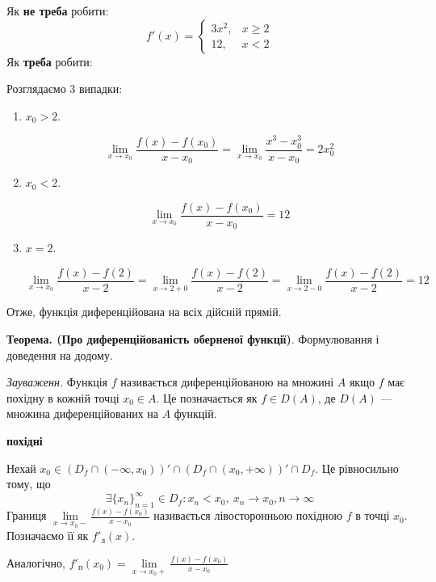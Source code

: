 \documentclass[12pt]{report}
\begin{document}
\begin{enumerate}
Як \textbf{не треба} робити:
$$f'(x) = \begin{cases} 3 x^2,& x \geq 2 \\ 12, & x < 2\end{cases}$$
Як \textbf{треба} робити:

\vspace{1mm}

Розглядаємо $3$ випадки:

\begin{enumerate}
\item $x_0 > 2$.

$$\lim_{x \to x_0}\frac{f(x) - f(x_0)}{x - x_0} = \lim_{x \to x_0}\frac{x^3 - x_0^3}{x - x_0} = 2 x_0^2$$

\item $x_0 < 2$.

$$\lim_{x \to x_0}\frac{f(x) - f(x_0)}{x - x_0} = 12$$

\item $x = 2$.

$$\lim_{x \to x_0}\frac{f(x) - f(2)}{x - 2} = \lim_{x \to 2+0}\frac{f(x) - f(2)}{x - 2} = \lim_{x \to 2-0}\frac{f(x) - f(2)}{x - 2} = 12$$
\end{enumerate}

Отже, функція диференційована на всіх дійсній прямій.
 
\end{enumerate}

\textbf{Теорема. (Про диференційованість оберненої функції)}. Формулювання і доведення на додому.

\textit{Зауваженн.} Функція $f$ називається диференційованою на множині $A$ якщо $f$ має 
похідну в кожній точці $x_0 \in A$. Це позначається як $f \in D(A)$, де $D(A)$ --- множина диференційованих на $A$ функцій. 

\begin{center}
\textbf{ похідні}
\end{center}

Нехай $x_0 \in (D_f \cap (-\infty, x_0))' \cap (D_f \cap (x_0, +\infty))'\cap D_f$. Це рівносильно тому, що 
$$\exists \{ x_n\}_{n=1}^{\infty} \in D_f : x_n < x_0,\ x_n \to x_0, n \to \infty $$
Границя $\lim\limits_{x\to x_0-}\frac{f(x) - f(x_0)}{x - x_0}$ називається лівосторонньою похідною $f$ в точці $x_0$. Позначаємо її як $f'_{л}(x)$.

Аналогічно, $f'_{п} (x_0) = \lim\limits_{x \to x_0+} \frac{f(x) - f(x_0)}{x - x_0}$

\vspace{3mm}
\end{document}
